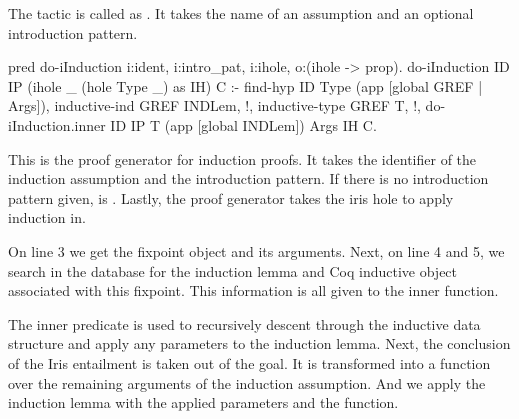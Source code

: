 \documentclass[thesis.tex]{subfiles}
\begin{document}
{The  tactic is called as . It takes the name of an assumption and an optional introduction pattern.
\begin{elpicode}
  pred do-iInduction i:ident, i:intro_pat, i:ihole, 
                     o:(ihole -> prop).
  do-iInduction ID IP (ihole _ (hole Type _) as IH) C :-
    find-hyp ID Type (app [global GREF | Args]),
    inductive-ind GREF INDLem, !,
    inductive-type GREF T, !,
    do-iInduction.inner ID IP T (app [global INDLem]) 
                        Args IH C.
\end{elpicode}
This is the proof generator for induction proofs. It takes the identifier of the induction assumption and the introduction pattern. If there is no introduction pattern given,  is . Lastly, the proof generator takes the iris hole to apply induction in.

On line 3 we get the fixpoint object and its arguments. Next, on line 4 and 5, we search in the database for the induction lemma and Coq inductive object associated with this fixpoint. This information is all given to the inner function.
%


The inner predicate is used to recursively descent through the inductive data structure and apply any parameters to the induction lemma. Next, the conclusion of the Iris entailment is taken out of the goal. It is transformed into a function over the remaining arguments of the induction assumption. And we apply the induction lemma with the applied parameters and the function.

}
\end{document}
